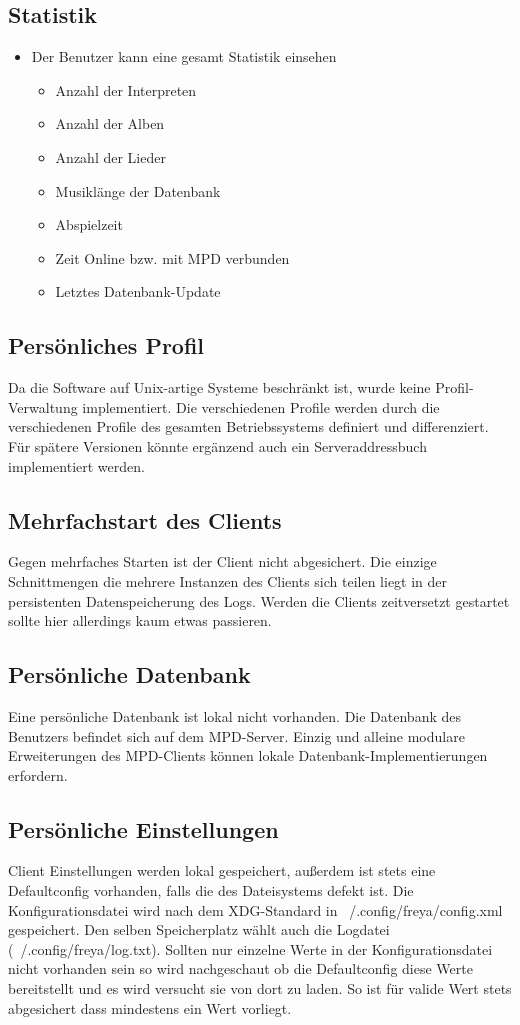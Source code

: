 \subsection{Statistik}
\begin{itemize}
	\item Der Benutzer kann eine gesamt Statistik einsehen
	\begin{itemize}
		\item Anzahl der Interpreten
		\item Anzahl der Alben
		\item Anzahl der Lieder
		\item Musiklänge der Datenbank
		\item Abspielzeit	
		\item Zeit Online bzw. mit MPD verbunden
		\item Letztes Datenbank-Update
	\end{itemize}
\end{itemize}

\subsection{Persönliches Profil}
Da die Software auf Unix-artige Systeme beschränkt ist, wurde keine Profil-Verwaltung implementiert. Die
verschiedenen Profile werden durch die verschiedenen Profile des gesamten Betriebssystems definiert und differenziert.
Für spätere Versionen könnte ergänzend auch ein Serveraddressbuch implementiert werden.
\subsection{Mehrfachstart des Clients}
Gegen mehrfaches Starten ist der Client nicht abgesichert. Die einzige Schnittmengen die mehrere Instanzen des Clients sich teilen 
liegt in der persistenten Datenspeicherung des Logs. Werden die Clients zeitversetzt gestartet sollte hier allerdings kaum etwas passieren. 
\subsection{Persönliche Datenbank}
Eine persönliche Datenbank ist lokal nicht vorhanden. Die Datenbank des Benutzers befindet sich auf dem MPD-Server.
Einzig und alleine modulare Erweiterungen des MPD-Clients können lokale Datenbank-Implementierungen erfordern.
\subsection{Persönliche Einstellungen}
Client Einstellungen werden lokal gespeichert, außerdem ist stets eine Defaultconfig vorhanden, falls die des Dateisystems defekt ist.
Die Konfigurationsdatei wird nach dem XDG-Standard in ~/.config/freya/config.xml gespeichert. Den selben Speicherplatz wählt auch die Logdatei 
(~/.config/freya/log.txt). Sollten nur einzelne Werte in der Konfigurationsdatei nicht vorhanden sein so wird nachgeschaut ob die Defaultconfig
diese Werte bereitstellt und es wird versucht sie von dort zu laden. So ist für valide Wert stets abgesichert dass mindestens ein Wert vorliegt.
